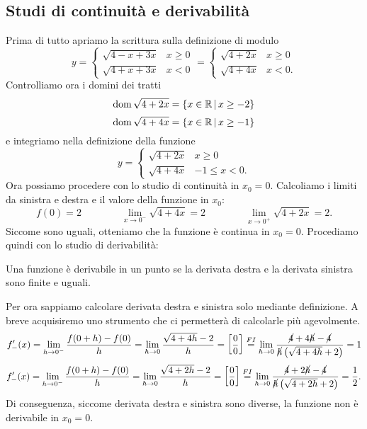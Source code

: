 \subsection{Studi di continuità e derivabilità}
\begin{ex}
    [Studiare continuità e derivabilità della funzione $y=\sqrt{4-|x|+3x}$ in $x_0=0$]
    Prima di tutto apriamo la scrittura sulla definizione di modulo
    \[y=\begin{cases}
        \sqrt{4-x+3x} & x\geq 0\\
        \sqrt{4+x+3x} & x < 0
    \end{cases} = \begin{cases}
        \sqrt{4+2x} & x\geq 0\\
        \sqrt{4+4x} & x < 0.
    \end{cases}\]
    Controlliamo ora i domini dei tratti
    \[\operatorname{dom}\sqrt{4+2x}=\{x\in \mathbb{R}\, |\, x\geq -2\}\]
    \[\operatorname{dom}\sqrt{4+4x}=\{x\in \mathbb{R}\, |\, x\geq -1\}\]
    e integriamo nella definizione della funzione
    \[y=\begin{cases}
        \sqrt{4+2x} & x\geq 0\\
        \sqrt{4+4x} & -1 \leq x < 0.
    \end{cases}\]
    Ora possiamo procedere con lo studio di continuità in $x_0=0$. Calcoliamo i limiti da sinistra e destra e il valore della funzione in $x_0$:
    \[
        f(0)=2 \qquad\qquad
        \lim_{x\to 0^-}\sqrt{4+4x}=2\qquad \qquad
        \lim_{x\to 0^+}\sqrt{4+2x}=2.
    \]
    Siccome sono uguali, otteniamo che la funzione è continua in $x_0=0$. Procediamo quindi con lo studio di derivabilità:
    \begin{ricorda}
        Una funzione è derivabile in un punto se la derivata destra e la derivata sinistra sono finite e uguali.
    \end{ricorda}
    Per ora sappiamo calcolare derivata destra e sinistra solo mediante definizione. A breve acquisiremo uno strumento che ci permetterà di calcolarle più agevolmente.
    \[f'_-(x)=\lim_{h\to0^-}\frac{f(0+h)-f(0)}{h}=\lim_{h\to0}\frac{\sqrt{4+4h}-2}{h}=\left[ \frac{0}{0} \right]\overset{FI}{=}\lim_{h\to0}\frac{\cancel{4}+4\cancel{h}-\cancel{4}}{\cancel{h}\left( \sqrt{4+4h}+2 \right)}=1\]
    \[f'_-(x)=\lim_{h\to0^-}\frac{f(0+h)-f(0)}{h}=\lim_{h\to0}\frac{\sqrt{4+2h}-2}{h}=\left[ \frac{0}{0} \right]\overset{FI}{=}\lim_{h\to0}\frac{\cancel{4}+2\cancel{h}-\cancel{4}}{\cancel{h}\left( \sqrt{4+2h}+2 \right)}=\frac{1}{2}.\]
    Di conseguenza, siccome derivata destra e sinistra sono diverse, la funzione non è derivabile in $x_0=0$.
\end{ex}
